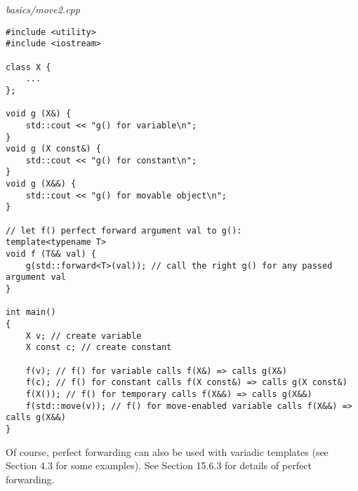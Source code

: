 \noindent
\textit{basics/move2.cpp}
\begin{lstlisting}[style=styleCXX]
#include <utility>
#include <iostream>

class X {
	...
};

void g (X&) {
	std::cout << "g() for variable\n";
}
void g (X const&) {
	std::cout << "g() for constant\n";
}
void g (X&&) {
	std::cout << "g() for movable object\n";
}

// let f() perfect forward argument val to g():
template<typename T>
void f (T&& val) {
	g(std::forward<T>(val)); // call the right g() for any passed argument val
}

int main()
{
	X v; // create variable
	X const c; // create constant
	
	f(v); // f() for variable calls f(X&) => calls g(X&)
	f(c); // f() for constant calls f(X const&) => calls g(X const&)
	f(X()); // f() for temporary calls f(X&&) => calls g(X&&)
	f(std::move(v)); // f() for move-enabled variable calls f(X&&) => calls g(X&&)
}
\end{lstlisting}

Of course, perfect forwarding can also be used with variadic templates (see Section 4.3 for some examples). See Section 15.6.3 for details of perfect forwarding.






